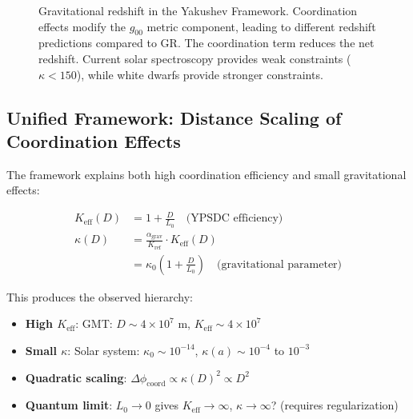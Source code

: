 \documentclass[11pt,a4paper]{article}
\begin{document}
\begin{figure}[htbp]
{
		}
		\caption{Gravitational redshift in the Yakushev Framework. Coordination effects modify the $g_{00}$ metric component, leading to different redshift predictions compared to GR. The coordination term reduces the net redshift. Current solar spectroscopy provides weak constraints ($\kappa < 150$), while white dwarfs provide stronger constraints.}
		\label{fig:redshift-detailed}
	\end{figure}
\subsection{Unified Framework: Distance Scaling of Coordination Effects}

The framework explains both high coordination efficiency and small gravitational effects:

\begin{align}
	K_{\mathrm{eff}}(D) &= 1 + \frac{D}{L_0} \quad \text{(YPSDC efficiency)} \\
	\kappa(D) &= \frac{\alpha_{\text{grav}}}{K_{\text{ref}}} \cdot K_{\mathrm{eff}}(D) \\
	&= \kappa_0 \left(1 + \frac{D}{L_0}\right) \quad \text{(gravitational parameter)}
\end{align}

This produces the observed hierarchy:
\begin{itemize}
	\item \textbf{High $K_{\mathrm{eff}}$}: GMT: $D \sim 4\times10^7$ m, $K_{\mathrm{eff}} \sim 4\times10^7$
	\item \textbf{Small $\kappa$}: Solar system: $\kappa_0 \sim 10^{-14}$, $\kappa(a) \sim 10^{-4}$ to $10^{-3}$
	\item \textbf{Quadratic scaling}: $\Delta\phi_{\text{coord}} \propto \kappa(D)^2 \propto D^2$
	\item \textbf{Quantum limit}: $L_0 \to 0$ gives $K_{\mathrm{eff}} \to \infty$, $\kappa \to \infty$? (requires regularization)
\end{itemize}
\end{document}
